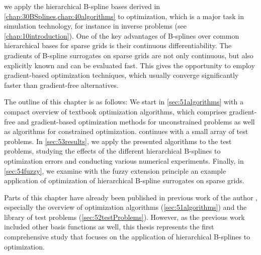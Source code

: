 
\label{chap:50optimization}

we apply the hierarchical B-spline bases derived in
\cref{chap:30BSplines,chap:40algorithms} to optimization,
which is a major task in simulation technology,
for instance in inverse problems (see \cref{chap:10introduction}).
One of the key advantages of B-splines over common hierarchical bases for
sparse grids is their continuous differentiability.
The gradients of B-spline surrogates on sparse grids are not only continuous,
but also explicitly known and can be evaluated fast.
This gives the opportunity to employ gradient-based optimization techniques,
which usually converge significantly faster than gradient-free alternatives.

The outline of this chapter is as follows:
We start in \cref{sec:51algorithms}
with a compact overview of textbook optimization algorithms,
which comprises gradient-free and gradient-based optimization methods
for unconstrained problems as well as algorithms for constrained optimization.
 continues with a small array of test problems.
In \cref{sec:53results}, we apply the presented algorithms
to the test problems, studying the effects of the different
hierarchical B-splines to optimization errors and conducting various
numerical experiments.
Finally, in \cref{sec:54fuzzy}, we examine with the fuzzy extension principle
an example application of optimization of hierarchical B-spline surrogates on
sparse grids.

Parts of this chapter have already been published in previous work
of the author \cite{Valentin14Hierarchische}, especially
the overview of optimization algorithms (\cref{sec:51algorithms})
and the library of test problems (\cref{sec:52testProblems}).
However, as the previous work included other basis functions as well,
this thesis represents the first comprehensive study
that focuses on the application of hierarchical B-splines to optimization.






\cleardoublepage
